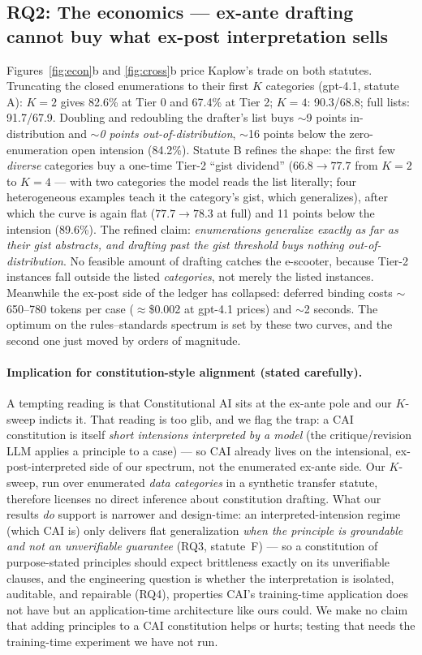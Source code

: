 \subsection{RQ2: The economics --- ex-ante drafting cannot buy what ex-post
interpretation sells}

Figures~\ref{fig:econ}b and \ref{fig:cross}b price Kaplow's trade on both
statutes. Truncating the closed enumerations to their first $K$ categories
(gpt-4.1, statute A): $K{=}2$ gives 82.6\% at Tier 0 and 67.4\% at Tier 2;
$K{=}4$: 90.3/68.8; full lists: 91.7/67.9. Doubling and redoubling the
drafter's list buys $\sim$9 points in-distribution and \emph{$\sim$0 points
out-of-distribution}, $\sim$16 points below the zero-enumeration open
intension (84.2\%). Statute B refines the shape: the first few
\emph{diverse} categories buy a one-time Tier-2 ``gist dividend'' ($66.8 \to
77.7$ from $K{=}2$ to $K{=}4$ --- with two categories the model reads the
list literally; four heterogeneous examples teach it the category's gist,
which generalizes), after which the curve is again flat ($77.7 \to 78.3$ at
full) and 11 points below the intension (89.6\%). The refined claim:
\emph{enumerations generalize exactly as far as their gist abstracts, and
drafting past the gist threshold buys nothing out-of-distribution}. No
feasible amount of drafting catches the e-scooter, because Tier-2 instances
fall outside the listed \emph{categories}, not merely the listed instances.
Meanwhile the ex-post side of the ledger has collapsed: deferred binding
costs $\sim$650--780 tokens per case ($\approx$\$0.002 at gpt-4.1 prices)
and $\sim$2 seconds. The optimum on the rules--standards spectrum is set by
these two curves, and the second one just moved by orders of magnitude.

\paragraph{Implication for constitution-style alignment (stated carefully).}
A tempting reading is that Constitutional AI \citep{bai2022constitutional}
sits at the ex-ante pole and our $K$-sweep indicts it. That reading is too
glib, and we flag the trap: a CAI constitution is itself \emph{short
intensions interpreted by a model} (the critique/revision LLM applies a
principle to a case) --- so CAI already lives on the intensional,
ex-post-interpreted side of our spectrum, not the enumerated ex-ante side.
Our $K$-sweep, run over enumerated \emph{data categories} in a synthetic
transfer statute, therefore licenses no direct inference about constitution
drafting. What our results \emph{do} support is narrower and design-time: an
interpreted-intension regime (which CAI is) only delivers flat generalization
\emph{when the principle is groundable and not an unverifiable guarantee}
(RQ3, statute~F) --- so a constitution of purpose-stated principles should
expect brittleness exactly on its unverifiable clauses, and the engineering
question is whether the interpretation is isolated, auditable, and repairable
(RQ4), properties CAI's training-time application does not have but an
application-time architecture like ours could. We make no claim that adding
principles to a CAI constitution helps or hurts; testing that needs the
training-time experiment we have not run.

